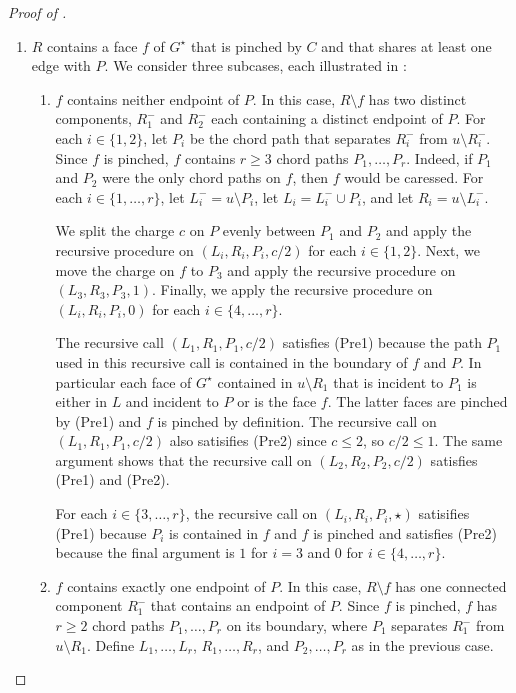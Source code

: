 \documentclass{patmorin}
\newcommand{\dual}[1]{{#1}^\star}
\begin{document}
\begin{proof}[Proof of ]
\begin{enumerate}
     \item $R$ contains a face $f$ of $\dual{G}$ that is pinched by $C$ and that shares
     at least one edge with $P$.  We consider three subcases, each illustrated in :
     \begin{enumerate}
	\item $f$ contains neither endpoint of $P$. In this case,
	$R\setminus f$ has two distinct components, $R_1^-$ and $R_2^-$ each containing a distinct endpoint of $P$.  For each $i\in\{1,2\}$, let $P_i$ be the chord path that separates $R_i^-$ from $u\setminus R_i^-$.  Since $f$ is pinched, $f$ contains $r\ge 3$ chord paths $P_1,\ldots,P_{r}$.  Indeed, if $P_1$ and $P_2$ were the only chord paths on $f$, then $f$ would be caressed.  For each $i\in\{1,\ldots,r\}$, let $L_i^-=u\setminus P_i$, let $L_i=L_i^-\cup P_i$, and let $R_i=u\setminus L_i^-$.

    We split the charge $c$ on $P$ evenly between $P_1$ and $P_2$ and apply the recursive procedure on $(L_i,R_i,P_i,c/2)$ for each $i\in\{1,2\}$. Next, we move the charge on $f$ to $P_3$ and apply the recursive procedure on $(L_3,R_3,P_3,1)$.  Finally, we apply the recursive procedure on $(L_i,R_i,P_i,0)$ for each $i\in\{4,\ldots,r\}$.

    The recursive call $(L_1,R_1,P_1,c/2)$ satisfies (Pre1) because the path $P_1$ used in this recursive call is contained in the boundary of $f$ and $P$. In particular each face of $\dual{G}$ contained in $u\setminus R_1$ that is incident to $P_1$ is either in $L$ and incident to $P$ or is the face $f$.  The latter faces are pinched by (Pre1) and $f$ is pinched by definition.  The recursive call on $(L_1,R_1,P_1,c/2)$ also satisifies (Pre2) since $c\le 2$, so $c/2\le 1$.  The same argument shows that the recursive call on $(L_2,R_2,P_2,c/2)$ satisfies (Pre1) and (Pre2).

    For each $i\in\{3,\ldots,r\}$, the recursive call on $(L_i,R_i,P_i,\star)$ satisifies (Pre1) because $P_i$ is contained in $f$ and $f$ is pinched and satisfies (Pre2) because the final argument is $1$ for $i=3$ and $0$ for $i\in\{4,\ldots,r\}$.

	\item $f$ contains exactly one endpoint of $P$.  In this case, $R\setminus f$ has one connected component $R_1^-$ that contains an endpoint of $P$.  Since $f$ is pinched, $f$ has $r\ge 2$ chord paths $P_1,\ldots,P_r$ on its boundary, where $P_1$ separates $R_1^-$ from $u\setminus R_1$. Define $L_1,\ldots,L_r$, $R_1,\ldots,R_r$, and $P_2,\ldots,P_r$ as in the previous case.


\end{enumerate}
\end{enumerate}
\end{proof}
\end{document}
